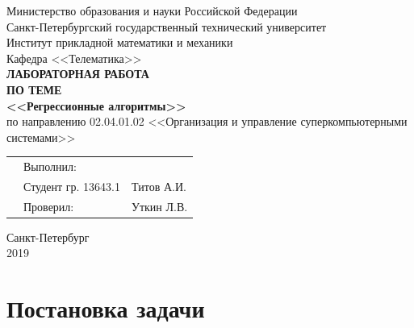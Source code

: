 \documentclass[]{article}
\numberwithin{equation}{section}
\begin{document}
    \thispagestyle{empty}
	\begin{center}
		Министерство образования и науки Российской Федерации\\
		Санкт-Петербургский государственный технический университет\\
		Институт прикладной математики и механики\\
		Кафедра <<Телематика>>\\
		\vspace{5cm}
		\textbf{\textbf{ЛАБОРАТОРНАЯ РАБОТА}}\\
        \vspace{0.5cm}
        \textbf{ПО ТЕМЕ}\\
        \vspace{0.5cm}
		\textbf{\textbf{<<Регрессионные алгоритмы>>}}\\
		\vspace{3cm}
		по направлению 02.04.01.02 <<Организация и управление суперкомпьютерными системами>>
	\end{center}
	\vspace{2cm}
	\begin{tabular} {l l l}
	\hspace{9.5cm} & Выполнил: & \\
	& Студент гр. 13643.1 & Титов А.И.\\
	& Проверил: & Уткин Л.В.
	\end{tabular}
	\vspace{4.5cm}
	\begin{center}
		Санкт-Петербург\\
		2019
    \end{center}


	\renewcommand\contentsname{Оглавление}
	\tableofcontents

    \newpage
    \section*{Постановка задачи}
\end{document}
